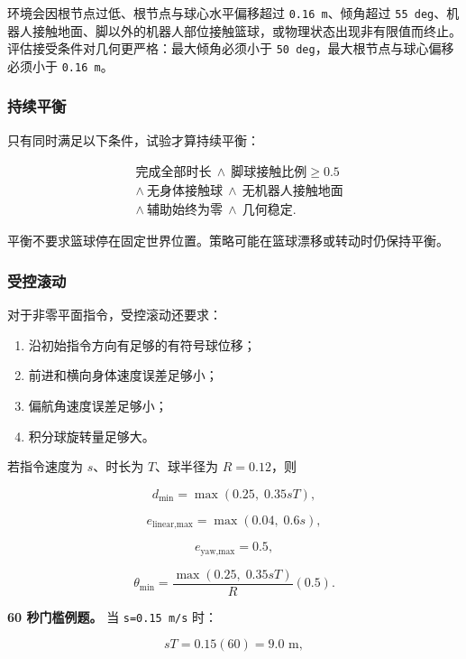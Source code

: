 \documentclass[
  chinese,
  11pt,
  letterpaper,
]{article}
\providecommand{\tightlist}{%
  \setlength{\itemsep}{0pt}\setlength{\parskip}{0pt}}
\begin{document}
环境会因根节点过低、根节点与球心水平偏移超过 \texttt{0.16\ m}、倾角超过
\texttt{55\ deg}、机器人接触地面、脚以外的机器人部位接触篮球，或物理状态出现非有限值而终止。评估接受条件对几何更严格：最大倾角必须小于
\texttt{50\ deg}，最大根节点与球心偏移必须小于 \texttt{0.16\ m}。

\subsubsection{持续平衡}\label{ux6301ux7eedux5e73ux8861}

只有同时满足以下条件，试验才算持续平衡：

\[
\begin{aligned}
&\text{完成全部时长}\ \land\ \text{脚球接触比例}\ge0.5\\
&\land\ \text{无身体接触球}\ \land\ \text{无机器人接触地面}\\
&\land\ \text{辅助始终为零}\ \land\ \text{几何稳定}.
\end{aligned}
\]

平衡不要求篮球停在固定世界位置。策略可能在篮球漂移或转动时仍保持平衡。

\subsubsection{受控滚动}\label{ux53d7ux63a7ux6edaux52a8}

对于非零平面指令，受控滚动还要求：

\begin{enumerate}
\def\labelenumi{\arabic{enumi}.}
\tightlist
\item
  沿初始指令方向有足够的有符号球位移；
\item
  前进和横向身体速度误差足够小；
\item
  偏航角速度误差足够小；
\item
  积分球旋转量足够大。
\end{enumerate}

若指令速度为 \(s\)、时长为 \(T\)、球半径为 \(R=0.12\)，则

\[
d_{\min}=\max(0.25,\;0.35sT),
\]

\[
e_{\text{linear,max}}=\max(0.04,\;0.6s),
\]

\[
e_{\text{yaw,max}}=0.5,
\]

\[
\theta_{\min}
=\frac{\max(0.25,\;0.35sT)}{R}(0.5).
\]

\textbf{60 秒门槛例题。} 当 \texttt{s=0.15\ m/s} 时：

\[
sT=0.15(60)=9.0\text{ m},
\]
\end{document}

